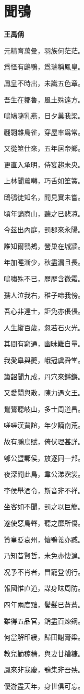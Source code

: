 \documentclass[12pt,a4paper]{ctexbook}
\begin{document}
\section{聞鴞}
\textbf{王禹偁}\par\vspace{0.5em}
元精育萬彙，羽族何茫茫。\par
爲怪有鴟鴞，爲瑞稱鳳皇。\par
鳳皇不時出，未識五色章。\par
吾生在鄒魯，風土殊遠方。\par
鳴鳩隨乳燕，日夕巢我梁。\par
翩翾雜鳥雀，穿屋率爲常。\par
又從筮仕來，五年居帝鄉。\par
更直入承明，侍宴趨未央。\par
上林聞鶑囀，巧舌如笙簧。\par
鴟鴞徒知名，聞見實未嘗。\par
頃年謫商山，聽之已悲凉。\par
今茲出內庭，罰郡來永陽。\par
誰知爾鸋鴂，營巢在城牆。\par
年加睡漸少，秋盡漏且長。\par
鳴嘯殊不已，歷歷含微霜。\par
孺人泣我右，稚子啼我傍。\par
吾心非達士，詎免亦倀倀。\par
人生縱百歲，忽若石火光。\par
其間有窮通，幽昧難自量。\par
我愛臯與夔，峨冠虞舜堂。\par
簫韶聞九成，丹穴來鏘鏘。\par
又愛閎與散，陳力遇文王。\par
鸑鷟聽岐山，多士周道昌。\par
嗟嗟漢賈誼，年少謫南荒。\par
故有鵩鳥賦，倚伏理甚詳。\par
郇公暨鄴侯，放逐同一邦。\par
夜深聞此鳥，韋公涕霑裳。\par
李侯舉酒令，斯音非不祥。\par
坐客如不聞，罰之以巨觴。\par
遂使惡鳥聲，聽之靡所傷。\par
贊皇貶袁州，懷鴞義亦臧。\par
乃知昔賢哲，未免亦悽遑。\par
况予不肖者，冒寵登朝行。\par
報國惟直道，謀身昧周防。\par
四年兩度黜，鬢髮已蒼蒼。\par
雖得五品官，銷盡百煉鋼。\par
何當解印綬，歸田謝膏粱。\par
教兒勤稼穡，與妻甘糟糠。\par
鳳來非我慶，鴞集非吾殃。\par
優游盡天年，身世俱可忘。\par
\end{document}
